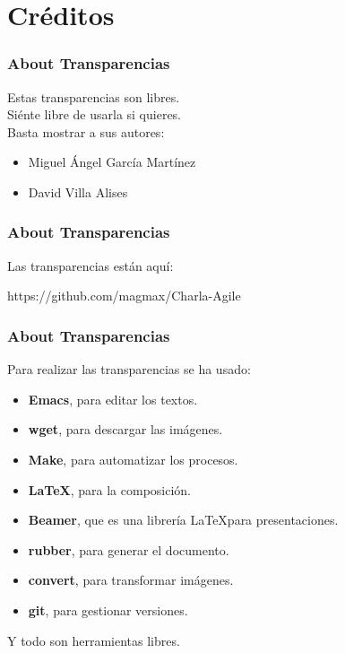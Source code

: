 \section{Créditos}

 \begin{frame}
  \frametitle{About Transparencias}

  Estas transparencias son libres. \\
  Siénte libre de usarla si quieres.\\
  Basta mostrar a sus autores:

  \begin{itemize}
   \item Miguel Ángel García Martínez
   \item David Villa Alises
  \end{itemize}
 \end{frame}


 \begin{frame}
  \frametitle{About Transparencias}

  Las transparencias están aquí:

  \begin{center}
   https://github.com/magmax/Charla-Agile\\
  \end{center}
 \end{frame}


 \begin{frame}
  \frametitle{About Transparencias}

  Para realizar las transparencias se ha usado:

  \begin{itemize}
   \item \textbf{Emacs}, para editar los textos.
   \item \textbf{wget}, para descargar las imágenes.
   \item \textbf{Make}, para automatizar los procesos.
   \item \textbf{\LaTeX}, para la composición.
   \item \textbf{Beamer}, que es una librería \LaTeX para presentaciones.
   \item \textbf{rubber}, para generar el documento.
   \item \textbf{convert}, para transformar imágenes.
   \item \textbf{git}, para gestionar versiones.
  \end{itemize}

  Y todo son herramientas libres.
 \end{frame}


